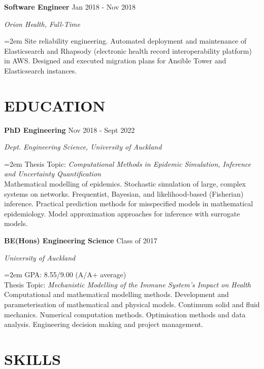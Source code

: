 \documentclass[paper=a4paper,fontsize=11pt]{scrartcl} %
\newcommand{\NewPart}[1]{\section*{\uppercase{#1}}}
\newcommand{\EducationEntry}[4]{
		\noindent \textbf{#1} \hfill      %
		{#2} \par  %
		\noindent \textit{#3} \par        %
		\noindent\hangindent=2em\hangafter=0 \small #4 %
		\normalsize \par\par}
\newcommand{\WorkEntry}[4]{				  %
		\noindent \textbf{#1} \hfill      %
		{#2} \par  %
		\noindent \textit{#3} \par              %
		\noindent\hangindent=2em\hangafter=0 \small #4 %
		\normalsize \par\par}
\begin{document}
\WorkEntry{Software Engineer}{Jan 2018 - Nov 2018}{Orion Health, Full-Time}{Site reliability engineering. Automated deployment and maintenance of Elasticsearch and Rhapsody (electronic health record interoperability platform) in AWS. Designed and executed migration plans for Ansible Tower and Elasticsearch instances.}




\NewPart{Education}

\EducationEntry{PhD Engineering}{Nov 2018 - Sept 2022}{Dept. Engineering Science, University of Auckland}{Thesis Topic: \textit{Computational Methods in Epidemic Simulation, Inference and Uncertainty Quantification}\\ Mathematical modelling of epidemics. Stochastic simulation of large, complex systems on networks. Frequentist, Bayesian, and likelihood-based (Fisherian) inference. Practical prediction methods for misspecified models in mathematical epidemiology. Model approximation approaches for inference with surrogate models.}

\EducationEntry{BE(Hons) Engineering Science}{Class of 2017}{University of Auckland}{GPA: 8.55/9.00 (A/A+ average)\\ Thesis Topic: \textit{Mechanistic Modelling of the Immune System's Impact on Health} \\ Computational and mathematical modelling methods. Development and parameterisation of mathematical and physical models. Continuum solid and fluid mechanics. Numerical computation methods. Optimisation methods and data analysis. Engineering decision making and project management.}


\NewPart{Skills}
\end{document}
